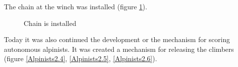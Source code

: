 The chain at the winch was installed (figure \ref{Winch2.10}).

\begin{figure}[H]
	\begin{minipage}[h]{1\linewidth}
		\caption{Chain is installed}
		\label{Winch2.10}
	\end{minipage}
\end{figure}

Today it was also continued the development or the mechanism for scoring autonomous alpinists. It was created a mechanism for releasing the climbers (figure \ref{Alpinists2.4}, \ref{Alpinists2.5}, \ref{Alpinists2.6}).

